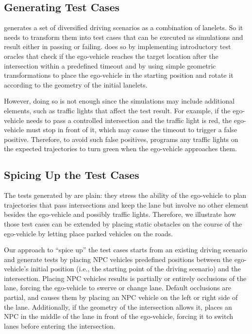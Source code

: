 \documentclass[conference]{IEEEtran}
\begin{document}



\subsection{Generating Test Cases}
\tool generates a set of diversified driving scenarios as a combination of lanelets. So it needs to transform them into test cases that can be executed as simulations and result either in passing or failing.
\tool does so by implementing introductory test oracles that check if the ego-vehicle reaches the target location after the intersection within a predefined timeout and by using simple geometric transformations to place the ego-vehicle in the starting position and rotate it according to the geometry of the initial lanelets.

However, doing so is not enough since the simulations may include additional elements, such as traffic lights that affect the test result. For example, if the ego-vehicle needs to pass a controlled intersection and the traffic light is red, the ego-vehicle must stop in front of it, which may cause the timeout to trigger a false positive. Therefore, to avoid such false positives, \tool programs any traffic lights on the expected trajectories to turn green when the ego-vehicle approaches them.

\subsection{Spicing Up the Test Cases}
The tests generated by \tool are plain: they stress the ability of the ego-vehicle to plan trajectories that pass intersections and keep the lane but involve no other element besides the ego-vehicle and possibly traffic lights. 
Therefore, we illustrate how those test cases can be extended by placing static obstacles on the course of the ego-vehicle by letting  \tool place parked vehicles on the roads. 

Our approach to ``spice up'' the test cases starts from an existing driving scenario and generate tests by placing NPC vehicles predefined positions between the ego-vehicle's initial position (i.e., the starting point of the driving scenario) and the intersection. Placing NPC vehicles results is partially or entirely occlusions of the lane, forcing the ego-vehicle to swerve or change lane. Default occlusions are partial, and \tool causes them by placing an NPC vehicle on the left or right side of the lane. Additionally, if the geometry of the intersection allows it, \tool places an NPC in the middle of the lane in front of the ego-vehicle, forcing it to switch lanes before entering the intersection.
\end{document}

